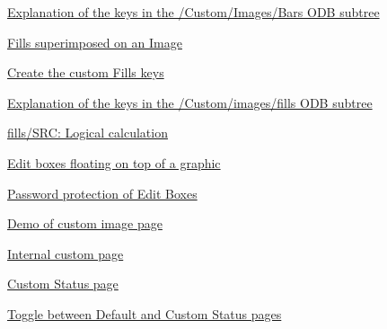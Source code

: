 \begin{TabularC}{2}
\begin{TabularC}{2}
\begin{DoxyItemize}
\begin{DoxyItemize}
\begin{DoxyItemize}
\begin{DoxyItemize}
\begin{DoxyItemize}
\begin{DoxyItemize}
\begin{DoxyItemize}
\item \hyperlink{RC_mhttpd_Image_access_RC_mhttpd_bars_tree}{Explanation of the keys in the /Custom/Images/Bars ODB subtree} 
\end{DoxyItemize}
\item \hyperlink{RC_mhttpd_Image_access_RC_mhttpd_custom_fills}{Fills superimposed on an Image} 
\begin{DoxyItemize}
\item \hyperlink{RC_mhttpd_Image_access_RC_mhttpd_custom_fills_create}{Create the custom Fills keys} 
\item \hyperlink{RC_mhttpd_Image_access_RC_mhttpd_fills_tree}{Explanation of the keys in the /Custom/images/fills ODB subtree} 
\begin{DoxyItemize}
\item \hyperlink{RC_mhttpd_Image_access_RC_mhttpd_fills_src_logical}{fills/SRC: Logical calculation} 
\end{DoxyItemize}
\end{DoxyItemize}
\item \hyperlink{RC_mhttpd_Image_access_RC_mhttpd_custom_edit_boxes}{Edit boxes floating on top of a graphic} 
\begin{DoxyItemize}
\item \hyperlink{RC_mhttpd_Image_access_RC_mhttpd_custom_pw}{Password protection of Edit Boxes} 
\end{DoxyItemize}
\item \hyperlink{RC_mhttpd_custom_demo}{Demo of custom image page} 
\item \hyperlink{RC_mhttpd_Internal}{Internal custom page} 
\end{DoxyItemize}
\item \hyperlink{RC_mhttpd_custom_status}{Custom Status page} 
\begin{DoxyItemize}
\item \hyperlink{RC_mhttpd_custom_status_RC_mhttpd_status_toggle}{Toggle between Default and Custom Status pages} 
\end{DoxyItemize}
\end{DoxyItemize}
\end{DoxyItemize}
\end{DoxyItemize}
\end{DoxyItemize}\par
 

\end{DoxyItemize}
\end{TabularC}
\end{TabularC}
